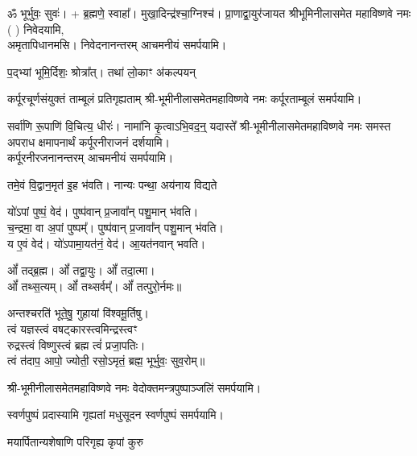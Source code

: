 \begin{center}
ॐ भूर्भुवः॒ सुवः॑। + ब्र॒ह्मणे॒ स्वाहा᳚।
{मुखा॒दिन्द्र॑श्चा॒ग्निश्च॑। प्रा॒णाद्वा॒युर॑जायत}
श्रीभूमिनीलासमेत महाविष्णवे नमः (	) निवेदयामि, \\
अमृतापिधानमसि। निवेदनानन्तरम् आचमनीयं समर्पयामि।\medskip

{प॒द्भ्यां भूमि॒र्दिशः॒ श्रोत्रा᳚त्। तथा॑ लो॒काꣳ अ॑कल्पयन्}

{कर्पूरचूर्णसंयुक्तं ताम्बूलं प्रतिगृह्यताम्}
श्री-भूमीनीलासमेतमहाविष्णवे नमः कर्पूरताम्बूलं समर्पयामि।\medskip

{सर्वा॑णि रू॒पाणि॑ वि॒चित्य॒ धीरः॑। नामा॑नि कृ॒त्वाऽभि॒वद॒न्॒ यदास्ते᳚}
श्री-भूमीनीलासमेतमहाविष्णवे नमः समस्त अपराध क्षमापनार्थं कर्पूरनीराजनं दर्शयामि।\\
कर्पूरनीरजनानन्तरम् आचमनीयं समर्पयामि।\medskip

{तमे॒वं वि॒द्वान॒मृत॑ इ॒ह भ॑वति। नान्यः पन्था॒ अय॑नाय विद्यते}

यो॑ऽपां पुष्पं॒ वेद॑। पुष्प॑वान् प्र॒जावा᳚न् पशु॒मान् भ॑वति।\\
च॒न्द्रमा॒ वा अ॒पां पुष्पम्᳚। पुष्प॑वान् प्र॒जावा᳚न् पशु॒मान् भ॑वति।\\
य ए॒वं वेद॑। यो॑ऽपामा॒यत॑नं॒ वेद॑। आ॒यत॑नवान् भवति।\medskip

ओं᳚ तद्ब्र॒ह्म। ओं᳚ तद्वा॒युः। ओं᳚ तदा॒त्मा।\\ ओं᳚ तथ्स॒त्यम्‌।
ओं᳚ तथ्सर्वम्᳚‌। ओं᳚ तत्पुरो॒र्नमः॥\medskip

अन्तश्चरति॑ भूते॒षु॒ गुहायां वि॑श्वमू॒र्तिषु। \\
त्वं यज्ञस्त्वं वषट्कारस्त्वमिन्द्रस्त्वꣳ\\ रुद्रस्त्वं विष्णुस्त्वं ब्रह्म त्वं॑ प्रजा॒पतिः। \\
त्वं त॑दाप॒ आपो॒ ज्योती॒ रसो॒ऽमृतं॒ ब्रह्म॒ भूर्भुवः॒ सुव॒रोम्‌॥\medskip

\medskip

श्री-भूमीनीलासमेतमहाविष्णवे नमः वेदोक्तमन्त्रपुष्पाञ्जलिं समर्पयामि।\medskip

{स्वर्णपुष्पं प्रदास्यामि गृह्यतां मधुसूदन}
स्वर्णपुष्पं समर्पयामि।\medskip

{मयार्पितान्यशेषाणि परिगृह्य कृपां कुरु}


\end{center}
